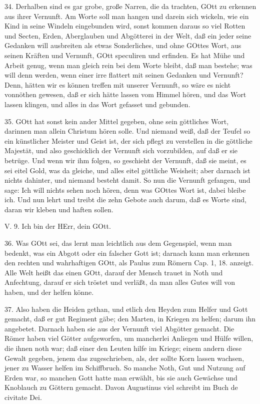 34. Derhalben sind es gar grobe, große Narren, die da trachten, GOtt zu erkennen aus ihrer Vernunft. Am Worte soll man hangen und darein sich wickeln, wie ein Kind in seine Windeln eingebunden wird, sonst kommen daraus so viel Rotten und Secten, Erden, Aberglauben und Abgötterei in der Welt, daß ein jeder seine Gedanken will ausbreiten als etwas Sonderliches, und ohne GOttes Wort, aus seinen Kräften und Vernunft, GOtt speculiren und erfinden. Es hat Mühe und Arbeit genug, wenn man gleich rein bei dem Worte bleibt, daß man bestehe; was will denn werden, wenn einer irre flattert mit seinen Gedanken und Vernunft? Denn, hätten wir es können treffen mit unserer Vernunft, so wäre es nicht vonnöthen gewesen, daß er sich hätte lassen vom Himmel hören, und das Wort lassen klingen, und alles in das Wort gefasset und gebunden.

35. GOtt hat sonst kein ander Mittel gegeben, ohne sein göttliches Wort, darinnen man allein Christum hören solle. Und niemand weiß, daß der Teufel so ein künstlicher Meister und Geist ist, der sich pflegt zu verstellen in die göttliche Majestät, und also geschicklich der Vernunft sich vorzubilden, auf daß er sie betrüge. Und wenn wir ihm folgen, so geschieht der Vernunft, daß sie meint, es sei eitel Gold, was da gleiche, und alles eitel göttliche Weisheit; aber darnach ist nichts dahinter, und niemand besteht damit. So nun die Vernunft gefangen, und sage: Ich will nichts sehen noch hören, denn was GOttes Wort ist, dabei bleibe ich. Und nun lehrt und treibt die zehn Gebote auch darum, daß es Worte sind, daran wir kleben und haften sollen.

\begin{schriftzitat}
V. 9. Ich bin der HErr, dein GOtt.
\end{schriftzitat}

36. Was GOtt sei, das lernt man leichtlich aus dem Gegenspiel, wenn man bedenkt, was ein Abgott oder ein falscher Gott ist; darnach kann man erkennen den rechten und wahrhaftigen GOtt, als Paulus zum Römern Cap. 1, 18. anzeigt. Alle Welt heißt das einen GOtt, darauf der Mensch trauet in Noth und Anfechtung, darauf er sich tröstet und verläßt, da man alles Gutes will von haben, und der helfen könne.

37. Also haben die Heiden gethan, und etlich den Heyden zum Helfer und Gott gemacht, daß er gut Regiment gäbe; den Marten, in Kriegen zu helfen; darum ihn angebetet. Darnach haben sie aus der Vernunft viel Abgötter gemacht. Die Römer haben viel Götter aufgeworfen, um mancherlei Anliegen und Hülfe willen, die ihnen noth war; daß einer den Leuten hilfe im Kriege; einem andern diese Gewalt gegeben, jenem das zugeschrieben, als, der sollte Korn lassen wachsen, jener zu Wasser helfen im Schiffbruch. So manche Noth, Gut und Nutzung auf Erden war, so manchen Gott hatte man erwählt, bis sie auch Gewächse und Knoblauch zu Göttern gemacht. Davon Augustinus viel schreibt im Buch de civitate Dei.

